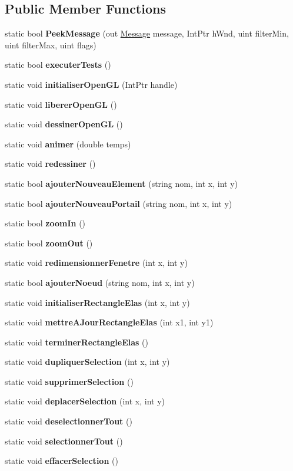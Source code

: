 \subsection*{Public Member Functions}
\begin{DoxyCompactItemize}
\item 
static bool {\bfseries Peek\+Message} (out \hyperlink{struct_interface_graphique_1_1_fonctions_natives_1_1_message}{Message} message, Int\+Ptr h\+Wnd, uint filter\+Min, uint filter\+Max, uint flags)
\item 
static bool {\bfseries executer\+Tests} ()
\item 
static void {\bfseries initialiser\+Open\+GL} (Int\+Ptr handle)
\item 
static void {\bfseries liberer\+Open\+GL} ()
\item 
static void {\bfseries dessiner\+Open\+GL} ()
\item 
static void {\bfseries animer} (double temps)
\item 
static void {\bfseries redessiner} ()
\item 
static bool {\bfseries ajouter\+Nouveau\+Element} (string nom, int x, int y)
\item 
static bool {\bfseries ajouter\+Nouveau\+Portail} (string nom, int x, int y)
\item 
static bool {\bfseries zoom\+In} ()
\item 
static bool {\bfseries zoom\+Out} ()
\item 
static void {\bfseries redimensionner\+Fenetre} (int x, int y)
\item 
static bool {\bfseries ajouter\+Noeud} (string nom, int x, int y)
\item 
static void {\bfseries initialiser\+Rectangle\+Elas} (int x, int y)
\item 
static void {\bfseries mettre\+A\+Jour\+Rectangle\+Elas} (int x1, int y1)
\item 
static void {\bfseries terminer\+Rectangle\+Elas} ()
\item 
static void {\bfseries dupliquer\+Selection} (int x, int y)
\item 
static void {\bfseries supprimer\+Selection} ()
\item 
static void {\bfseries deplacer\+Selection} (int x, int y)
\item 
static void {\bfseries deselectionner\+Tout} ()
\item 
static void {\bfseries selectionner\+Tout} ()
\item 
static void {\bfseries effacer\+Selection} ()

\end{DoxyCompactItemize}
